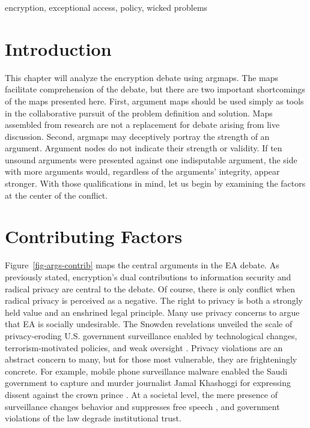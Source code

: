 \documentclass[conference]{IEEEtran}
\newcommand{\myfig}[1]{Figure~\ref{#1}}
\begin{document}
\begin{IEEEkeywords}
encryption, exceptional access, policy, wicked problems
\end{IEEEkeywords}



\section{Introduction}
\label{sec-intro}


This chapter will analyze the \ac{encryption} debate using \acp{argmap}. The maps facilitate comprehension of the
debate, but there are two important shortcomings of the maps presented here. First, argument maps should be used simply
as tools in the collaborative pursuit of the problem definition and solution. Maps assembled from research are not a
replacement for debate arising from live discussion. Second, \acp{argmap} may deceptively portray the strength of an
argument. Argument nodes do not indicate their strength or validity. If ten unsound arguments were presented against one
indisputable argument, the side with more arguments would, regardless of the arguments' integrity, appear stronger. With
those qualifications in mind, let us begin by examining the factors at the center of the conflict.


\section{Contributing Factors}
\label{sed-arg-contrib}

\myfig{fig-args-contrib} maps the central arguments in the EA debate. As previously stated, \ac{encryption}'s dual
contributions to information security and radical privacy are central to the debate. Of course, there is only conflict
when radical privacy is perceived as a negative. The right to privacy is both a strongly held value and an enshrined
legal principle. Many use privacy concerns to argue that \ac{EA} is socially undesirable. The Snowden revelations
\cite{landau_making_2013} unveiled the scale of privacy-eroding U.S. government surveillance enabled by technological
changes, terrorism-motivated policies, and weak oversight \cite{shamsi_2011}. Privacy violations are an abstract concern
to many, but for those most vulnerable, they are frighteningly concrete. For example, mobile phone surveillance malware
enabled the Saudi government to capture and murder journalist Jamal Khashoggi for expressing dissent against the crown
prince \cite{liebermann_2019}. At a societal level, the mere presence of surveillance changes behavior and suppresses
free speech \cite{rogaway_moral_2015}, and government violations of the law degrade institutional trust.
\end{document}
